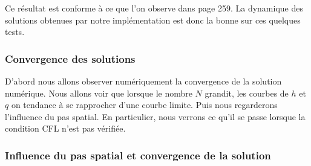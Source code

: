 \documentclass[
11pt, %
francais, %
singlespacing, %
headsepline, %
]{MastersDoctoralThesis} %
\theoremstyle{definition}
\begin{document}
Ce résultat est conforme à ce que l'on observe dans \cite{RL} page 259. La dynamique des solutions obtenues par notre implémentation est donc la bonne sur ces quelques tests.

\subsubsection{Convergence des solutions}

D’abord nous allons observer numériquement la convergence de la solution numérique. Nous allons voir que lorsque le nombre $N$ grandit, 
les courbes de $h$ et $q$ on tendance à se rapprocher d’une courbe limite. Puis nous regarderons l’influence du pas spatial. En particulier, nous verrons ce qu'il se passe lorsque la condition CFL n'est pas vérifiée.

\subsubsection{Influence du pas spatial et convergence de la solution}
\end{document}
